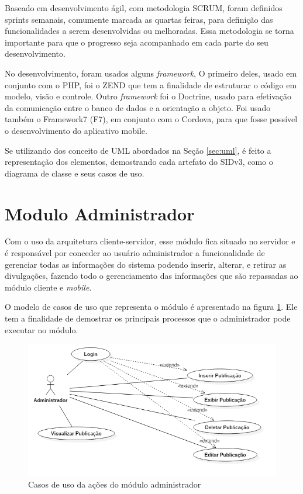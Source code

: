 Baseado em desenvolvimento ágil, com metodologia SCRUM, foram definidos sprints semanais, comumente marcada as quartas feiras, para definição das funcionalidades a serem desenvolvidas ou melhoradas. Essa metodologia se torna importante para que o progresso seja acompanhado em cada parte do seu desenvolvimento.

No desenvolvimento, foram usados alguns \textit{framework}, O primeiro deles, usado em conjunto com o PHP, foi o ZEND que tem a finalidade de estruturar o código em modelo, visão e controle. Outro \textit{framework} foi o Doctrine, usado para efetivação da comunicação entre o banco de dados e a orientação a objeto. Foi usado também o Framework7 (F7), em conjunto com o Cordova, para que fosse possível o desenvolvimento do aplicativo mobile. 

Se utilizando dos conceito de UML abordados na Seção \ref{sec:uml}, é  feito a representação dos elementos, demostrando cada artefato do SIDv3, como o diagrama de classe e seus casos de uso.

\section{Modulo Administrador}
Com o uso da arquitetura cliente-servidor, esse módulo fica situado no servidor e é responsável por conceder ao usuário administrador a funcionalidade de gerenciar todas as informações do sistema podendo inserir, alterar, e retirar as divulgações, fazendo todo o gerenciamento das informações que são repassadas ao módulo cliente e \textit{mobile}.

O modelo de casos de uso que representa o módulo é apresentado na figura \ref{fig:casosDeUsoADM}. Ele tem a finalidade de demostrar os principais processos que o administrador pode executar no módulo.

\begin{figure}[H]
\centering
\includegraphics[scale=0.6]{figuras/casosDeUsoADM}
\caption{Casos de uso da ações do módulo administrador}
\label{fig:casosDeUsoADM}
\end{figure}

